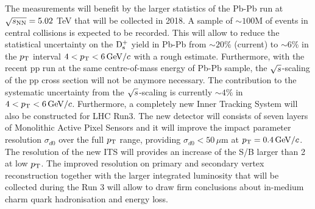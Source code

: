  
 The measurements will benefit by the larger statistics of the Pb-Pb run at 
 $\sqrt{s_{\rm NN}}=5.02$ TeV that will be collected in 2018. A sample of $\sim 100$M of events in central
 collisions is expected to be recorded. This will allow to reduce the statistical uncertainty
 on the ${\rm D_s^+}$ yield in Pb-Pb from $\sim 20\%$ (current) to $\sim 6\%$ in the 
 $p_{\rm T}$ interval $4 < p_{\rm T} < 6 \, \mathrm{GeV}/c$ with a rough estimate. Furthermore, with the recent pp run at the same centre-of-mass energy
 of Pb-Pb sample, the $\sqrt{s}$-scaling of the pp cross section will not be anymore necessary. 
 The contribution to the systematic uncertainty from the $\sqrt{s}$-scaling is currently $\sim4\%$ in $4 < p_{\rm T} < 6 \, \mathrm{GeV}/c$.
 Furthermore, a completely new Inner Tracking System will also be constructed for LHC Run3.
 The new detector will consists of seven layers of Monolithic Active Pixel Sensors and it will improve
 the impact parameter resolution $\sigma_{d0}$ over the full $p_{\rm T}$ range, providing $\sigma_{d0}<50\,\mu$m at
 $p_{\rm T} = 0.4 \, \mathrm{GeV}/c$. The resolution of the new ITS will provides an increase of the S/B larger than 2 at low $p_{\rm T}$.
The improved resolution on primary and secondary vertex reconstruction together with
the larger integrated luminosity that will be collected during the Run 3 will allow to draw firm conclusions 
about in-medium charm quark hadronisation and energy loss.
  



